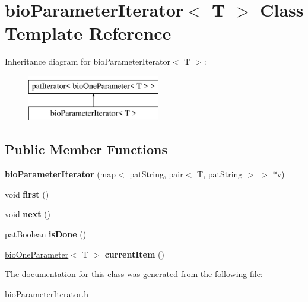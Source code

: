 \hypertarget{classbio_parameter_iterator}{}\section{bio\+Parameter\+Iterator$<$ T $>$ Class Template Reference}
\label{classbio_parameter_iterator}
Inheritance diagram for bio\+Parameter\+Iterator$<$ T $>$\+:\begin{figure}[H]
\begin{center}
\leavevmode
\includegraphics[height=2.000000cm]{classbio_parameter_iterator}
\end{center}
\end{figure}
\subsection*{Public Member Functions}
\begin{DoxyCompactItemize}
\item 
\mbox{\label{classbio_parameter_iterator_acaf2e4dbb845ae56ad4e828584233d68}} 
{\bfseries bio\+Parameter\+Iterator} (map$<$ pat\+String, pair$<$ T, pat\+String $>$ $>$ $\ast$v)
\item 
\mbox{\label{classbio_parameter_iterator_a861b88c4184863e99e0d5ba7e284d5aa}} 
void {\bfseries first} ()
\item 
\mbox{\label{classbio_parameter_iterator_ac451bc2cd0acccbaf657d03a86d9d7d6}} 
void {\bfseries next} ()
\item 
\mbox{\label{classbio_parameter_iterator_a35abb58e6be43a33883f85ab420f8d88}} 
pat\+Boolean {\bfseries is\+Done} ()
\item 
\mbox{\label{classbio_parameter_iterator_a652a255eb06da5d30f7f96b36e5cee05}} 
\hyperlink{classbio_one_parameter}{bio\+One\+Parameter}$<$ T $>$ {\bfseries current\+Item} ()
\end{DoxyCompactItemize}


The documentation for this class was generated from the following file\+:\begin{DoxyCompactItemize}
\item 
bio\+Parameter\+Iterator.\+h\end{DoxyCompactItemize}
